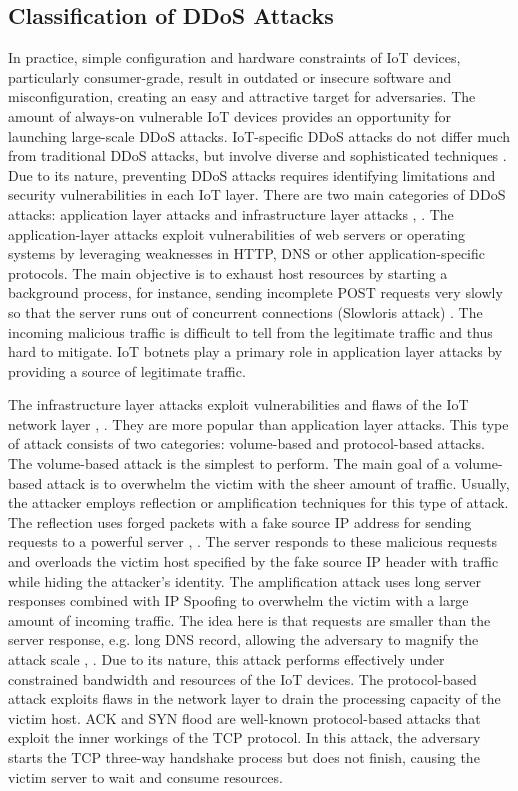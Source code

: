 \documentclass[conference, 11pt]{IEEEtran}
\begin{document}
    \subsection{Classification of DDoS Attacks}
    In practice, simple configuration and hardware constraints of IoT devices, particularly consumer-grade, result in outdated or insecure software and misconfiguration, creating an easy and attractive target for adversaries.
    The amount of always-on vulnerable IoT devices provides an opportunity for launching large-scale DDoS attacks.
    IoT-specific DDoS attacks do not differ much from traditional DDoS attacks, but involve diverse and sophisticated techniques \cite{article:14}.
    Due to its nature, preventing DDoS attacks requires identifying limitations and security vulnerabilities in each IoT layer.
    There are two main categories of DDoS attacks: application layer attacks and infrastructure layer attacks \cite{article:14}, \cite{article:8}.
    The application-layer attacks exploit vulnerabilities of web servers or operating systems by leveraging weaknesses in HTTP, DNS or other application-specific protocols.
    The main objective is to exhaust host resources by starting a background process, for instance, sending incomplete POST requests very slowly so that the server runs out of concurrent connections (Slowloris attack) \cite{damon2012hands}.
    The incoming malicious traffic is difficult to tell from the legitimate traffic and thus hard to mitigate.
    IoT botnets play a primary role in application layer attacks by providing a source of legitimate traffic.

    The infrastructure layer attacks exploit vulnerabilities and flaws of the IoT network layer \cite{article:14}, \cite{article:8}.
    They are more popular than application layer attacks.
    This type of attack consists of two categories: volume-based and protocol-based attacks.
    The volume-based attack is the simplest to perform.
    The main goal of a volume-based attack is to overwhelm the victim with the sheer amount of traffic.
    Usually, the attacker employs reflection or amplification techniques for this type of attack.
    The reflection uses forged packets with a fake source IP address for sending requests to a powerful server \cite{article:14}, \cite{article:8}.
    The server responds to these malicious requests and overloads the victim host specified by the fake source IP header with traffic while hiding the attacker's identity.
    The amplification attack uses long server responses combined with IP Spoofing to overwhelm the victim with a large amount of incoming traffic.
    The idea here is that requests are smaller than the server response, e.g. long DNS record, allowing the adversary to magnify the attack scale \cite{article:14}, \cite{article:8}.
    Due to its nature, this attack performs effectively under constrained bandwidth and resources of the IoT devices.
    The protocol-based attack exploits flaws in the network layer to drain the processing capacity of the victim host.
    ACK and SYN flood are well-known protocol-based attacks that exploit the inner workings of the TCP protocol.
    In this attack, the adversary starts the TCP three-way handshake process but does not finish, causing the victim server to wait and consume resources.
\end{document}
